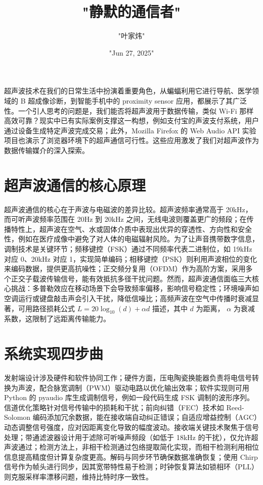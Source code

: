 \title{"静默的通信者"}
\author{"叶家炜"}
\date{"Jun 27, 2025"}
\maketitle
超声波技术在我们的日常生活中扮演着重要角色，从蝙蝠利用它进行导航、医学领域的 B 超成像诊断，到智能手机中的 proximity sensor 应用，都展示了其广泛性。一个引人思考的问题是，我们能否将超声波用于数据传输，类似 Wi-Fi 那样高效可靠？现实中已有实际案例支撑这一构想，例如支付宝的声波支付系统，用户通过设备生成特定声波完成交易；此外，Mozilla Firefox 的 Web Audio API 实验项目也演示了浏览器环境下的超声通信可行性。这些应用激发了我们对超声波作为数据传输媒介的深入探索。\par
\chapter{超声波通信的核心原理}
超声波通信的核心在于声波与电磁波的差异比较。超声波频率通常高于 20kHz，而可听声波频率范围在 20Hz 到 20kHz 之间，无线电波则覆盖更广的频段；在传播特性上，超声波在空气、水或固体介质中表现出优异的穿透性、方向性和安全性，例如在医疗成像中避免了对人体的电磁辐射风险。为了让声音携带数字信息，调制技术是关键环节；频移键控（FSK）通过不同频率代表二进制位，如 19kHz 对应 0、20kHz 对应 1，实现简单编码；相移键控（PSK）则利用声波相位的变化来编码数据，提供更高抗噪性；正交频分复用（OFDM）作为高阶方案，采用多个正交子载波传输信号，能有效抵抗多径干扰问题。然而，超声波通信面临三大核心挑战：多普勒效应在移动场景下会导致频率偏移，影响信号稳定性；环境噪声如空调运行或键盘敲击声会引入干扰，降低信噪比；高频声波在空气中传播时衰减显著，可用路径损耗公式 $L = 20\log_{10}(d) + \alpha d$ 描述，其中 $d$ 为距离， $\alpha$ 为衰减系数，这限制了远距离传输能力。\par
\chapter{系统实现四步曲}
发射端设计涉及硬件和软件协同工作；硬件方面，压电陶瓷换能器负责将电信号转换为声波，配合脉宽调制（PWM）驱动电路以优化输出效率；软件实现则可用 Python 的 pyaudio 库生成调制信号，例如一段代码生成 FSK 调制的波形序列。信道优化策略针对信号传输中的损耗和干扰；前向纠错（FEC）技术如 Reed-Solomon 编码添加冗余数据，能在接收端自动纠正错误；自适应增益控制（AGC）动态调整信号强度，应对因距离变化导致的幅度波动。接收端关键技术聚焦于信号处理；带通滤波器设计用于滤除可听噪声频段（如低于 18kHz 的干扰），仅允许超声波通过；检测方法上，非相干检测通过包络提取简化实现，而相干检测利用相位信息提高精度但计算复杂度更高。解码与同步环节确保数据准确恢复；使用 Chirp 信号作为帧头进行同步，因其宽带特性易于检测；时钟恢复算法如锁相环（PLL）则克服采样率漂移问题，维持比特时序一致性。\par
